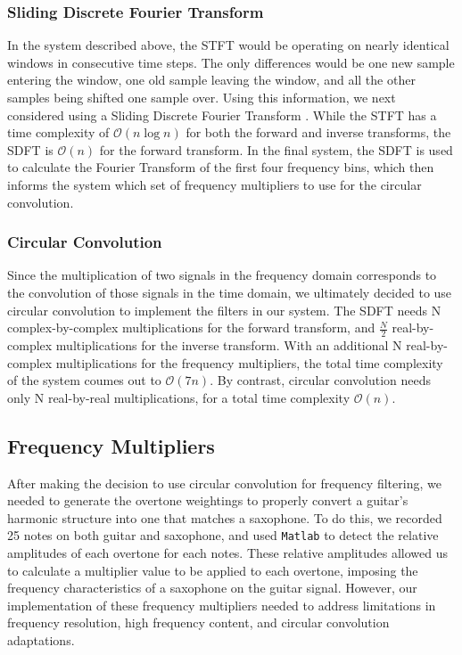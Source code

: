 \documentclass[twoside,a4paper]{article}
\begin{document}
\subsubsection{Sliding Discrete Fourier Transform}
In the system described above, the STFT would be operating on nearly identical
windows in consecutive time steps. The only differences would be one new sample
entering the window, one old sample leaving the window, and all the other samples
being shifted one sample over. Using this information, we next considered using a
Sliding Discrete Fourier Transform \cite{SDFT}. While the STFT has a time complexity
of $\mathcal{O}(n\log{}n)$ for both the forward and inverse transforms,
the SDFT is $\mathcal{O}(n)$ for the forward transform. In the final system, the SDFT is used to calculate the
Fourier Transform of the first four frequency bins, which then informs the system which set
of frequency multipliers to use for the circular convolution.

\subsubsection{Circular Convolution}
Since the multiplication of two signals in the frequency domain
corresponds to the convolution of those signals in the time domain,
we ultimately decided to use circular convolution to implement the
filters in our system. The SDFT needs N complex-by-complex multiplications
for the forward transform, and $\frac{N}{2}$ real-by-complex multiplications
for the inverse transform. With an additional N real-by-complex multiplications
for the frequency multipliers, the total time complexity of the system coumes out to
$\mathcal{O}(7n)$. By contrast, circular convolution needs only N real-by-real
multiplications, for a total time complexity $\mathcal{O}(n)$.

\subsection{Frequency Multipliers}
After making the decision to use circular convolution for frequency filtering, we needed to generate
the overtone weightings to properly convert a guitar's harmonic
structure into one that matches a saxophone. To do this, we recorded
25 notes on both guitar and saxophone, and used \texttt{Matlab} to detect the
relative amplitudes of each overtone for each notes. These relative
amplitudes allowed us to calculate a multiplier value to be applied to
each overtone, imposing the frequency characteristics of a saxophone on
the guitar signal. However, our implementation of these frequency multipliers
needed to address limitations in frequency resolution, high frequency content,
and circular convolution adaptations.
\end{document}
